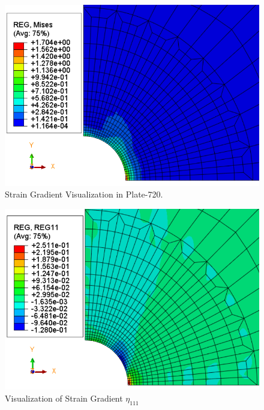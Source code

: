 \documentclass[12pt]{article}
\begin{document}
\begin{figure}[H]
	\begin{center}
		\includegraphics[scale=0.8]{full_grad_crop.png} 
	\end{center}  
   \caption{Strain Gradient Visualization in Plate-720.}
\end{figure}
\begin{figure}[H]
	\begin{center}
		\includegraphics[scale=0.8]{Reg11_crop.png} 
	\end{center}  
   \caption{Visualization of Strain Gradient $\eta_{111} $}
\end{figure}
\end{document}
